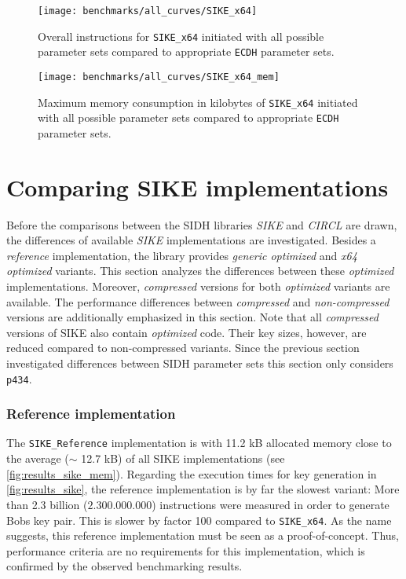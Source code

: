 \begin{figure}[H]
  \centering
  \texttt{[image: benchmarks/all\_curves/SIKE\_x64]}
  \caption[Overall instructions for all parameter sets via \texttt{SIKE\_x64} compared to \texttt{ECDH}]
  {Overall instructions for \texttt{SIKE\_x64} initiated with all possible parameter sets compared to appropriate \texttt{ECDH} parameter sets.}
  \label{fig:results_all_curves}
\end{figure}

\begin{figure}[H]
  \centering
  \texttt{[image: benchmarks/all\_curves/SIKE\_x64\_mem]}
  \caption[Maximum memory consumption for all parameter sets via \texttt{SIKE\_x64}  compared to \texttt{ECDH}]
  {Maximum memory consumption in kilobytes of \texttt{SIKE\_x64} initiated with all possible parameter sets compared to appropriate \texttt{ECDH} parameter sets.}
  \label{fig:results_all_curves_mem}
\end{figure}


\section{Comparing \gls{SIKE} implementations}\label{sec:analysis_sike}
Before the comparisons between the \gls{SIDH} libraries \textit{\gls{SIKE}} and \textit{\gls{CIRCL}} are drawn, the differences of available \textit{\gls{SIKE}} implementations are investigated. Besides a \textit{reference} implementation, the library provides \textit{generic optimized} and \textit{x64 optimized} variants. This section analyzes the differences between these \textit{optimized} implementations. Moreover,  \textit{compressed} versions for both \textit{optimized} variants are available. The performance differences between \textit{compressed} and \textit{non-compressed} versions are additionally emphasized in this section. Note that all \textit{compressed} versions of \gls{SIKE} also contain \textit{optimized} code. Their key sizes, however, are reduced compared to non-compressed variants. Since the previous section investigated differences between \gls{SIDH} parameter sets this section only considers \texttt{p434}.


\subsubsection{Reference implementation}
The \texttt{SIKE\_Reference} implementation is with 11.2 \gls{kB} allocated memory close to the average ($\sim$ 12.7 \gls{kB}) of all \gls{SIKE} implementations (see \autoref{fig:results_sike_mem}). Regarding the execution times for key generation in \autoref{fig:results_sike}, the reference implementation is by far the slowest variant: More than 2.3 billion ($2.300.000.000$) instructions were measured in order to generate Bobs key pair. This is slower by factor 100 compared to \texttt{SIKE\_x64}. As the name suggests, this reference implementation must be seen as a proof-of-concept. Thus, performance criteria are no requirements for this implementation, which is confirmed by the observed benchmarking results.

